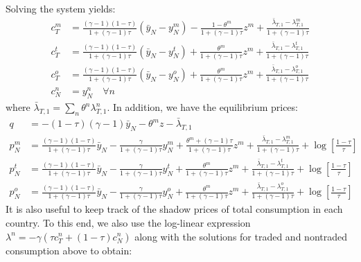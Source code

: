 Solving the system yields:
\begin{align*}
  c_T^m
  & = \frac{(\gamma - 1)(1 - \tau)}{1 + (\gamma - 1) \tau} \left( \bar{y}_N - y_N^m \right)
    - \frac{1 - \theta^m}{1 + (\gamma - 1) \tau} z^m
    + \frac{\bar{\lambda}_{T, 1} - \lambda^m_{T, 1}}{1 + (\gamma - 1) \tau} \\
  c_T^t
  & = \frac{(\gamma - 1)(1 - \tau)}{1 + (\gamma - 1) \tau} \left( \bar{y}_N - y_N^t \right)
    + \frac{\theta^m}{1 + (\gamma - 1) \tau} z^{m}
    + \frac{\bar{\lambda}_{T, 1} - \lambda^t_{T, 1}}{1 + (\gamma - 1) \tau}  \\
  c_T^o
  & = \frac{(\gamma - 1)(1 - \tau)}{1 + (\gamma - 1) \tau} \left( \bar{y}_N - y_N^o \right)
    + \frac{\theta^m}{1 + (\gamma - 1) \tau} z^{m}
    + \frac{\bar{\lambda}_{T, 1} - \lambda^o_{T, 1}}{1 + (\gamma - 1) \tau} \\
  c_N^n
  & = y_N^n \quad \forall n
\end{align*}
where $\bar{\lambda}_{T, 1} = \sum_n \theta^n \lambda^n_{T, 1}$. In
addition, we have the equilibrium prices:
\begin{align*}
  q
  & = - (1 - \tau)(\gamma - 1) \bar{y}_N - \theta^m z -
    \bar{\lambda}_{T, 1} \\
  p_N^m
  & = \frac{(\gamma - 1)(1 - \tau)}{1 + (\gamma - 1) \tau}
    \bar{y}_N - \frac{\gamma}{1 + (\gamma - 1) \tau} y_N^m +
    \frac{\theta^m + (\gamma - 1) \tau}{1 + (\gamma - 1) \tau}
    z^{m} + \frac{\bar{\lambda}_{T, 1} - \lambda^m_{T, 1}}{1 +
    (\gamma - 1) \tau}
    + \log [\frac{1 - \tau}{\tau}] \\
  p_N^t
  & = \frac{(\gamma - 1)(1 - \tau)}{1 + (\gamma - 1) \tau}
    \bar{y}_N - \frac{\gamma}{1 + (\gamma - 1) \tau} y_N^t +
    \frac{\theta^m}{1 + (\gamma - 1) \tau} z^{m} +
    \frac{\bar{\lambda}_{T, 1} - \lambda^t_{T, 1}}{1 + (\gamma -
    1) \tau}
    + \log [\frac{1 - \tau}{\tau}] \\
  p_N^o
  & = \frac{(\gamma - 1)(1 - \tau)}{1 + (\gamma - 1) \tau}
    \bar{y}_N - \frac{\gamma}{1 + (\gamma - 1) \tau} y_N^o +
    \frac{\theta^m}{1 + (\gamma - 1) \tau} z^{m} +
    \frac{\bar{\lambda}_{T, 1} - \lambda^o_{T, 1}}{1 + (\gamma -
    1) \tau} + \log [\frac{1 - \tau}{\tau}]
\end{align*}
It is also useful to keep track of the shadow prices of total
consumption in each country. To this end, we also use the log-linear
expression
$\lambda^n = -\gamma \left( \tau c_T^n + (1 - \tau) c_N^n \right)$
along with the solutions for traded and nontraded consumption above to
obtain:
